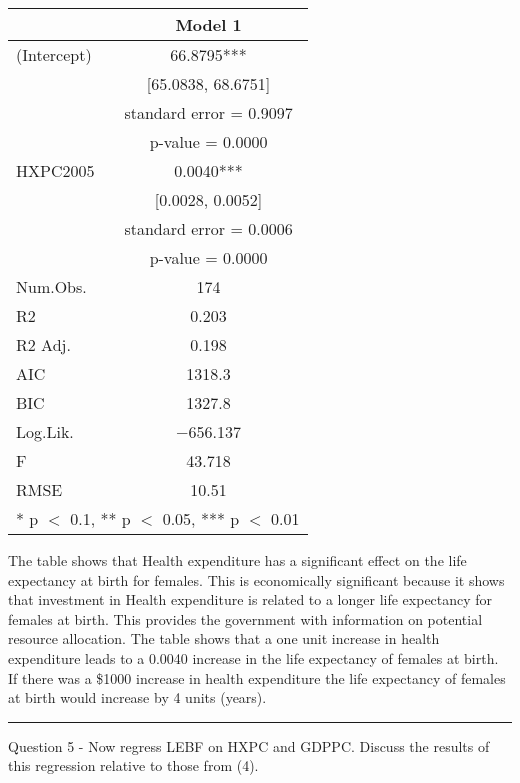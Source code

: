 \documentclass[
]{article}
\begin{document}
\begin{table}
\centering
\begin{tabular}[t]{lc}
\toprule
  & Model 1\\
\midrule
(Intercept) & \num{66.8795}***\\
 & {}[\num{65.0838}, \num{68.6751}]\\
 & standard error = \num{0.9097}\\
 & p-value = \vphantom{1} \num{0.0000}\\
HXPC2005 & \num{0.0040}***\\
 & {}[\num{0.0028}, \num{0.0052}]\\
 & standard error = \num{0.0006}\\
 & p-value = \num{0.0000}\\
\midrule
Num.Obs. & \num{174}\\
R2 & \num{0.203}\\
R2 Adj. & \num{0.198}\\
AIC & \num{1318.3}\\
BIC & \num{1327.8}\\
Log.Lik. & \num{-656.137}\\
F & \num{43.718}\\
RMSE & \num{10.51}\\
\bottomrule
\multicolumn{2}{l}{\rule{0pt}{1em}* p $<$ 0.1, ** p $<$ 0.05, *** p $<$ 0.01}\\
\end{tabular}
\end{table}

The table shows that Health expenditure has a significant effect on the
life expectancy at birth for females. This is economically significant
because it shows that investment in Health expenditure is related to a
longer life expectancy for females at birth. This provides the
government with information on potential resource allocation. The table
shows that a one unit increase in health expenditure leads to a 0.0040
increase in the life expectancy of females at birth. If there was a
\$1000 increase in health expenditure the life expectancy of females at
birth would increase by 4 units (years).

\begin{center}\rule{0.5\linewidth}{0.5pt}\end{center}

Question 5 - Now regress LEBF on HXPC and GDPPC. Discuss the results of
this regression relative to those from (4).
\end{document}
